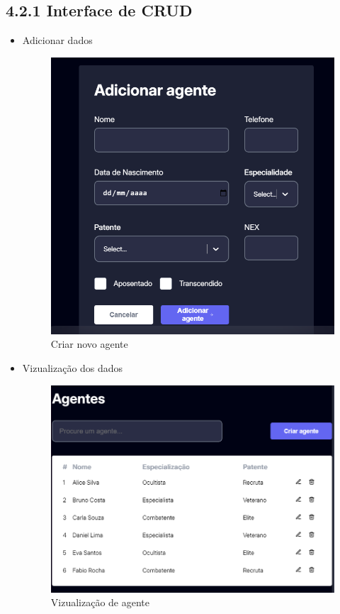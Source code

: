 \documentclass[12pt,a4paper]{report}
\begin{document}
\subsection{4.2.1 Interface de CRUD}
    \begin{itemize}
            \item Adicionar dados
    
        \begin{figure}[H]
            \centering
            \includegraphics[width=0.5\linewidth]{agentes_create.png}
            \caption{Criar novo agente }
            \label{fig:enter-label}
        \end{figure}
        
        \item Vizualização dos dados
        
        \begin{figure}[H]
            \centering
            \includegraphics[width=0.5\linewidth]{agentes_read.png}
            \caption{Vizualização de agente}
            \label{fig:enter-label}
        \end{figure}


\end{itemize}
\end{document}
